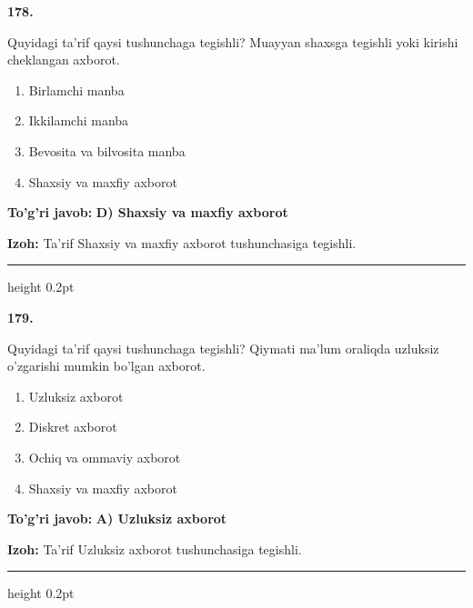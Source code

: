 \documentclass[10pt,a4paper,oneside]{article}
\begin{document}
\noindent\textbf{\color{ink}178.}
\par
Quyidagi ta'rif qaysi tushunchaga tegishli? Muayyan shaxsga tegishli yoki kirishi cheklangan axborot.
\begin{enumerate}[label=\Alph*),leftmargin=9mm]
\item Birlamchi manba
\item Ikkilamchi manba
\item Bevosita va bilvosita manba
\item Shaxsiy va maxfiy axborot
\end{enumerate}
\begin{tcolorbox}[enhanced,breakable,colback=teal!4,colframe=teal!50!black,boxrule=0.5pt,arc=1.1mm,left=3mm,right=3mm,top=1.7mm,bottom=1.7mm,before skip=2mm,after skip=2mm]
\textbf{\color{teal}To'g'ri javob:} \textbf{D) Shaxsiy va maxfiy axborot}
\par\smallskip
\textbf{Izoh:} Ta'rif Shaxsiy va maxfiy axborot tushunchasiga tegishli.
\end{tcolorbox}
\vspace{2mm}\hrule height 0.2pt \vspace{3mm}

\noindent\textbf{\color{ink}179.}
\par
Quyidagi ta'rif qaysi tushunchaga tegishli? Qiymati ma'lum oraliqda uzluksiz o'zgarishi mumkin bo'lgan axborot.
\begin{enumerate}[label=\Alph*),leftmargin=9mm]
\item Uzluksiz axborot
\item Diskret axborot
\item Ochiq va ommaviy axborot
\item Shaxsiy va maxfiy axborot
\end{enumerate}
\begin{tcolorbox}[enhanced,breakable,colback=teal!4,colframe=teal!50!black,boxrule=0.5pt,arc=1.1mm,left=3mm,right=3mm,top=1.7mm,bottom=1.7mm,before skip=2mm,after skip=2mm]
\textbf{\color{teal}To'g'ri javob:} \textbf{A) Uzluksiz axborot}
\par\smallskip
\textbf{Izoh:} Ta'rif Uzluksiz axborot tushunchasiga tegishli.
\end{tcolorbox}
\vspace{2mm}\hrule height 0.2pt \vspace{3mm}
\end{document}
